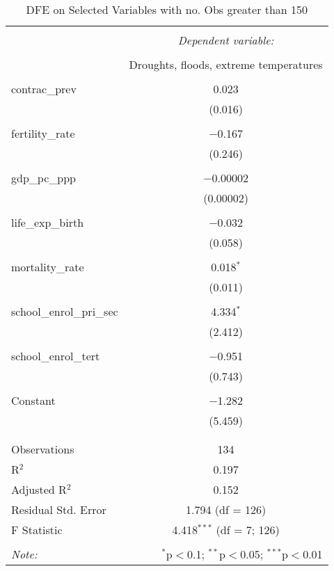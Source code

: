 
\begin{table}[!htbp] \centering 
  \caption{DFE on Selected Variables with no. Obs greater than 150} 
  \label{} 
\begin{tabular}{@{\extracolsep{5pt}}lc} 
\\[-1.8ex]\hline 
\hline \\[-1.8ex] 
 & \multicolumn{1}{c}{\textit{Dependent variable:}} \\ 
\cline{2-2} 
\\[-1.8ex] & Droughts, floods, extreme temperatures \\ 
\hline \\[-1.8ex] 
 contrac\_prev & 0.023 \\ 
  & (0.016) \\ 
  & \\ 
 fertility\_rate & $-$0.167 \\ 
  & (0.246) \\ 
  & \\ 
 gdp\_pc\_ppp & $-$0.00002 \\ 
  & (0.00002) \\ 
  & \\ 
 life\_exp\_birth & $-$0.032 \\ 
  & (0.058) \\ 
  & \\ 
 mortality\_rate & 0.018$^{*}$ \\ 
  & (0.011) \\ 
  & \\ 
 school\_enrol\_pri\_sec & 4.334$^{*}$ \\ 
  & (2.412) \\ 
  & \\ 
 school\_enrol\_tert & $-$0.951 \\ 
  & (0.743) \\ 
  & \\ 
 Constant & $-$1.282 \\ 
  & (5.459) \\ 
  & \\ 
\hline \\[-1.8ex] 
Observations & 134 \\ 
R$^{2}$ & 0.197 \\ 
Adjusted R$^{2}$ & 0.152 \\ 
Residual Std. Error & 1.794 (df = 126) \\ 
F Statistic & 4.418$^{***}$ (df = 7; 126) \\ 
\hline 
\hline \\[-1.8ex] 
\textit{Note:}  & \multicolumn{1}{r}{$^{*}$p$<$0.1; $^{**}$p$<$0.05; $^{***}$p$<$0.01} \\ 
\end{tabular} 
\end{table} 
